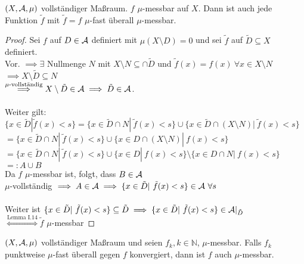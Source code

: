 \documentclass[11pt,a4paper,fleqn,openany]{report}
\begin{document}
    \newpage
    \begin{lemma}
      $(X, \mathcal{A}, \mu)$ vollständiger Maßraum. $f$ $\mu$-messbar auf $X$. Dann ist auch jede Funktion $\tilde{f}$ mit $\tilde{f}=f$ $\mu$-fast überall $\mu$-messbar.
    \end{lemma}

    \begin{proof}
      Sei $f$ auf $D \in \mathcal{A}$ definiert mit $\mu(X \setminus D) = 0$ und sei $\tilde{f}$ auf $\tilde{D} \subseteq X$ definiert.\\
      Vor. $\implies \exists$ Nullmenge $N$ mit $X \setminus N \subseteq \cap \tilde{D}$ und $\tilde{f}(x) = f(x) \ \forall x \in X \setminus N$\\
      $\implies X \setminus \tilde{D} \subseteq N$\\
      $\stackrel{\mu\text{-vollständig}}{\implies} X\setminus \tilde{D} \in \mathcal{A} \implies \tilde{D} \in \mathcal{A}$.\\ \\
      Weiter gilt: \\
      $\{x \in \tilde{D}| \tilde{f}(x) < s\} = \{x \in \tilde{D} \cap N |\ \tilde{f}(x) < s\} \cup \{x \in \tilde{D} \cap (X \setminus N)|\ \tilde{f}(x) < s\}$\\
      $ = \{x \in \tilde{D} \cap N |\ \tilde{f}(x) < s\} \cup \{x \in D \cap (X \setminus N) |\ f(x) < s\}$\\
      $ = \{x \in \tilde{D} \cap N |\ \tilde{f}(x) < s\} \cup \{x \in D|\ f(x) < s\} \setminus \{x \in D \cap N |\ f(x) < s\}$\\
      $=: A \cup B$\\
      Da $f$ $\mu$-messbar ist, folgt, dass $B \in \mathcal{A}$\\
      $\mu$-vollständig $\implies A \in \mathcal{A} \implies \{x \in \tilde{D} |\ \tilde{f}(x) < s\} \in \mathcal{A} \ \forall s$\\ \\
      Weiter ist $\{x \in \tilde{D}|\ \tilde{f}(x) < s\} \subseteq \tilde{D} \implies \{x \in \tilde{D}|\ \tilde{f}(x) < s\} \in \mathcal{A}|_{\tilde{D}}$\\
      $\stackrel{\text{Lemma I.14}}{\Leftrightarrow} \tilde{f}$ $\mu$-messbar
    \end{proof}

    \begin{theorem}
      $(X, \mathcal{A}, \mu)$ vollständiger Maßraum und seien $f_k, k \in \mathbb{N}$, $\mu$-messbar. Falls $f_k$ punktweise $\mu$-fast überall gegen $f$ konvergiert, dann ist $f$ auch $\mu$-messbar.
    \end{theorem}
\end{document}
